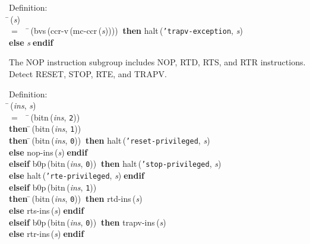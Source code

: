 \begin{tabbing}{\sc Definition}: \\  
\=\,({\it{s\/}}) \\ 
$=$$\;\;\;\;$\=\,({\rm{bvs}}\,({\rm{ccr-v}}\,({\rm{mc-ccr}}\,({\it{s\/}}))))$\;\;${\bf then }{\rm{halt}}\,({\tt{'}}{\tt{trapv-exception}}, {\it{s\/}}) \\ 
{\bf else }{\it{s\/}}$\;${\bf  endif}\-\-
\end{tabbing}

 The NOP instruction subgroup includes NOP, RTD, RTS, and RTR instructions.
 Detect RESET, STOP, RTE, and TRAPV.
\begin{tabbing}{\sc Definition}: \\  
\=\,({\it{ins\/}}, {\it{s\/}}) \\ 
$=$$\;\;\;\;$\=\,({\rm{bitn}}\,({\it{ins\/}}, {\tt{2}})) \\ 
{\bf then }\=\,({\rm{bitn}}\,({\it{ins\/}}, {\tt{1}})) \\ 
{\bf then }\=\,({\rm{bitn}}\,({\it{ins\/}}, {\tt{0}}))$\;\;${\bf then }{\rm{halt}}\,({\tt{'}}{\tt{reset-privileged}}, {\it{s\/}}) \\ 
{\bf else }{\rm{nop-ins}}\,({\it{s\/}})$\;${\bf  endif}\- \\ 
{\bf elseif }{\rm{b0p}}\,({\rm{bitn}}\,({\it{ins\/}}, {\tt{0}}))$\;\;${\bf then }{\rm{halt}}\,({\tt{'}}{\tt{stop-privileged}}, {\it{s\/}}) \\ 
{\bf else }{\rm{halt}}\,({\tt{'}}{\tt{rte-privileged}}, {\it{s\/}})$\;${\bf  endif}\- \\ 
{\bf elseif }{\rm{b0p}}\,({\rm{bitn}}\,({\it{ins\/}}, {\tt{1}})) \\ 
{\bf then }\=\,({\rm{bitn}}\,({\it{ins\/}}, {\tt{0}}))$\;\;${\bf then }{\rm{rtd-ins}}\,({\it{s\/}}) \\ 
{\bf else }{\rm{rts-ins}}\,({\it{s\/}})$\;${\bf  endif}\- \\ 
{\bf elseif }{\rm{b0p}}\,({\rm{bitn}}\,({\it{ins\/}}, {\tt{0}}))$\;\;${\bf then }{\rm{trapv-ins}}\,({\it{s\/}}) \\ 
{\bf else }{\rm{rtr-ins}}\,({\it{s\/}})$\;${\bf  endif}\-\-
\end{tabbing}

